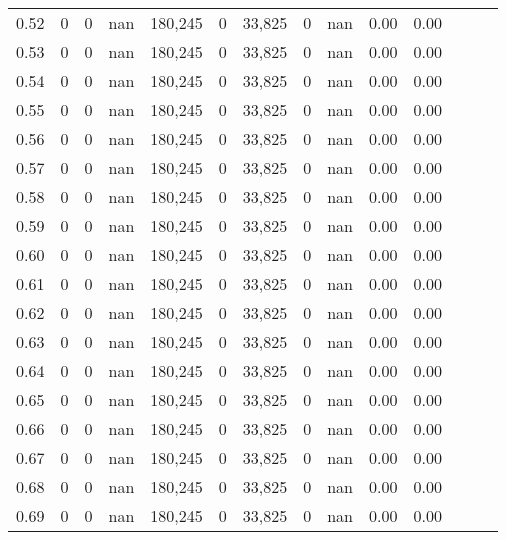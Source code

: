 \begin{tabular}{rrrrrrrrrrrrrr}
0.52 &       0 &      0 &   nan &  180,245 &        0 &  33,825 &       0 &   nan &  0.00 &      0.00 \\
0.53 &       0 &      0 &   nan &  180,245 &        0 &  33,825 &       0 &   nan &  0.00 &      0.00 \\
0.54 &       0 &      0 &   nan &  180,245 &        0 &  33,825 &       0 &   nan &  0.00 &      0.00 \\
0.55 &       0 &      0 &   nan &  180,245 &        0 &  33,825 &       0 &   nan &  0.00 &      0.00 \\
0.56 &       0 &      0 &   nan &  180,245 &        0 &  33,825 &       0 &   nan &  0.00 &      0.00 \\
0.57 &       0 &      0 &   nan &  180,245 &        0 &  33,825 &       0 &   nan &  0.00 &      0.00 \\
0.58 &       0 &      0 &   nan &  180,245 &        0 &  33,825 &       0 &   nan &  0.00 &      0.00 \\
0.59 &       0 &      0 &   nan &  180,245 &        0 &  33,825 &       0 &   nan &  0.00 &      0.00 \\
0.60 &       0 &      0 &   nan &  180,245 &        0 &  33,825 &       0 &   nan &  0.00 &      0.00 \\
0.61 &       0 &      0 &   nan &  180,245 &        0 &  33,825 &       0 &   nan &  0.00 &      0.00 \\
0.62 &       0 &      0 &   nan &  180,245 &        0 &  33,825 &       0 &   nan &  0.00 &      0.00 \\
0.63 &       0 &      0 &   nan &  180,245 &        0 &  33,825 &       0 &   nan &  0.00 &      0.00 \\
0.64 &       0 &      0 &   nan &  180,245 &        0 &  33,825 &       0 &   nan &  0.00 &      0.00 \\
0.65 &       0 &      0 &   nan &  180,245 &        0 &  33,825 &       0 &   nan &  0.00 &      0.00 \\
0.66 &       0 &      0 &   nan &  180,245 &        0 &  33,825 &       0 &   nan &  0.00 &      0.00 \\
0.67 &       0 &      0 &   nan &  180,245 &        0 &  33,825 &       0 &   nan &  0.00 &      0.00 \\
0.68 &       0 &      0 &   nan &  180,245 &        0 &  33,825 &       0 &   nan &  0.00 &      0.00 \\
0.69 &       0 &      0 &   nan &  180,245 &        0 &  33,825 &       0 &   nan &  0.00 &      0.00 \\

\end{tabular}
